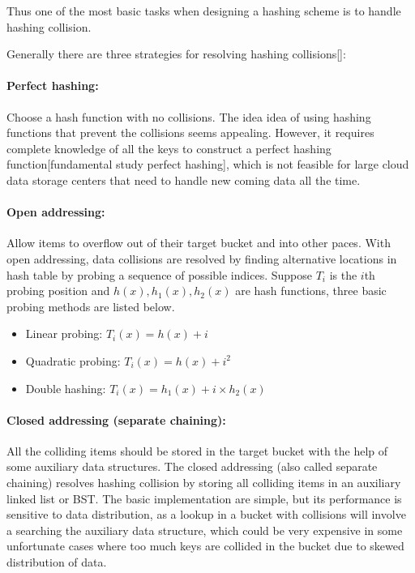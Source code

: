 \documentclass[runningheads]{llncs}
\begin{document}
Thus one of the most basic tasks when designing a hashing scheme is to handle hashing collision.

Generally there are three strategies for resolving hashing collisions[]:

\paragraph{\textbf{Perfect hashing:}} Choose a hash function with no collisions. The idea idea of using hashing functions that prevent the collisions seems appealing. However, it requires complete knowledge of all the keys to construct a perfect hashing function[fundamental study perfect hashing], which is not feasible for large cloud data storage centers that need to handle new coming data all the time.

\paragraph{\textbf{Open addressing:}} Allow items to overflow out of their target bucket and into other paces. With open addressing, data collisions are resolved by finding alternative locations in hash table by probing a sequence of possible indices. Suppose $T_i$ is the $i$th probing position and $h(x), h_1(x), h_2(x)$ are hash functions, three basic probing methods are listed below.
\begin{itemize}
    \item Linear probing: $T_i(x)=h(x)+i$
    \item Quadratic probing: $T_i(x)=h(x)+i^2$
    \item Double hashing: $T_i(x)=h_1(x)+i\times h_2(x)$
\end{itemize}

\paragraph{\textbf{Closed addressing (separate chaining):}} All the colliding items should be stored in the target bucket with the help of some auxiliary data structures. The closed addressing (also called separate chaining) resolves hashing collision by storing all colliding items in an auxiliary linked list or BST. The basic implementation are simple, but its performance is sensitive to data distribution, as a lookup in a bucket with collisions will involve a searching the auxiliary data structure, which could be very expensive in some unfortunate cases where too much keys are collided in the bucket due to skewed distribution of data.\\
\end{document}
